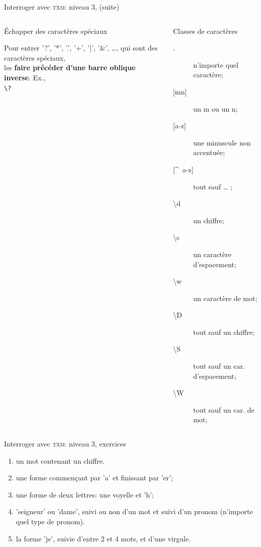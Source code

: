 \documentclass{beamer}
\begin{document}
\begin{frame}{Interroger avec \textsc{txm}: niveau 3, (suite)}

\begin{columns}
	\begin{column}{0.48\textwidth}
		
		\begin{block}{Échapper des caractères spéciaux}
			
			Pour entrer '?', '*', '.', '+', '|', '\&', …, qui sont des caractères spéciaux,\\
			les \textbf{faire précéder d'une barre oblique inverse}. Ex.,\\
			\texttt{\textbackslash?}
			
		\end{block}
		
	\end{column}
	\begin{column}{0.48\textwidth}
		
		
		\begin{block}{Classes de caractères}
		
		\begin{description}
			\item[.] n'importe quel caractère;
			\item[{[mn]}] un m ou un n;
			\item[{[a-z]}] une minuscule non accentuée;
			\item[{[\^~a-z]}] tout sauf … ;
			\item[\textbackslash{}d] un chiffre;
			\item[\textbackslash{}s] un caractère d'espacement;
			\item[\textbackslash{}w] un caractère de mot;
			\item[\textbackslash{}D] tout sauf un chiffre;
			\item[\textbackslash{}S] tout sauf un car. d'espacement;
			\item[\textbackslash{}W] tout sauf un car. de mot;
		\end{description}
		\end{block}
		
		
	\end{column}
\end{columns}


\end{frame}


\begin{frame}{Interroger avec \textsc{txm}: niveau 3, exercices}

\begin{enumerate}
	\item un mot contenant un chiffre.
	\item une forme commençant par 'a' et finissant par 'er';
	\item une forme de deux lettres: une voyelle et 'h';
	\item 'seigneur' ou 'dame', suivi ou non d'un mot et suivi d'un pronom (n'importe quel type de pronom).
	\item la forme 'je', suivie d'entre 2 et 4 mots, et d'une virgule.
\end{enumerate}

\end{frame}
\end{document}
